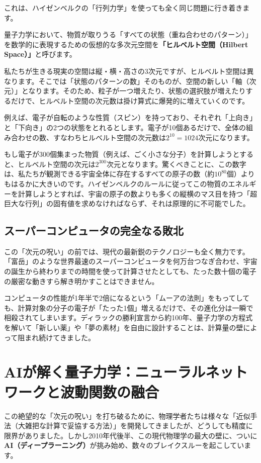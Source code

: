 これは、ハイゼンベルクの「行列力学」を使っても全く同じ問題に行き着きます。

量子力学において、物質が取りうる「すべての状態（重ね合わせのパターン）」を数学的に表現するための仮想的な多次元空間を\textbf{「ヒルベルト空間（Hilbert Space）」}と呼びます。

私たちが生きる現実の空間は縦・横・高さの3次元ですが、ヒルベルト空間は異なります。そこでは「状態のパターンの数」そのものが、空間の新しい「軸（次元）」となります。そのため、粒子が一つ増えたり、状態の選択肢が増えたりするだけで、ヒルベルト空間の次元数は掛け算式に爆発的に増えていくのです。

例えば、電子が自転のような性質（スピン）を持っており、それぞれ「上向き」と「下向き」の2つの状態をとれるとします。電子が10個あるだけで、全体の組み合わせの数、すなわちヒルベルト空間の次元数は\(2^{10} = 1024\)次元になります。

もし電子が300個集まった物質（例えば、ごく小さな分子）を計算しようとすると、ヒルベルト空間の次元は\(2^{300}\)次元となります。驚くべきことに、この数字は、私たちが観測できる宇宙全体に存在するすべての原子の数（約\(10^{80}\)個）よりもはるかに大きいのです。ハイゼンベルクのルールに従ってこの物質のエネルギーを計算しようとすれば、宇宙の原子の数よりも多くの縦横のマス目を持つ「超巨大な行列」の固有値を求めなければならず、それは原理的に不可能でした。

\subsection{スーパーコンピュータの完全なる敗北}

この「次元の呪い」の前では、現代の最新鋭のテクノロジーも全く無力です。「富岳」のような世界最速のスーパーコンピュータを何万台つなぎ合わせ、宇宙の誕生から終わりまでの時間を使って計算させたとしても、たった数十個の電子の厳密な動きすら解き明かすことはできません。

コンピュータの性能が1年半で2倍になるという「ムーアの法則」をもってしても、計算対象の分子の電子が「たった1個」増えるだけで、その進化分は一瞬で相殺されてしまいます。ディラックの勝利宣言から約100年、量子力学の方程式を解いて「新しい薬」や「夢の素材」を自由に設計することは、計算量の壁によって阻まれ続けてきました。

\section{AIが解く量子力学：ニューラルネットワークと波動関数の融合}

この絶望的な「次元の呪い」を打ち破るために、物理学者たちは様々な「近似手法（大雑把な計算で妥協する方法）」を開発してきましたが、どうしても精度に限界がありました。しかし2010年代後半、この現代物理学の最大の壁に、ついに\textbf{AI（ディープラーニング）}が挑み始め、数々のブレイクスルーを起こしています。

